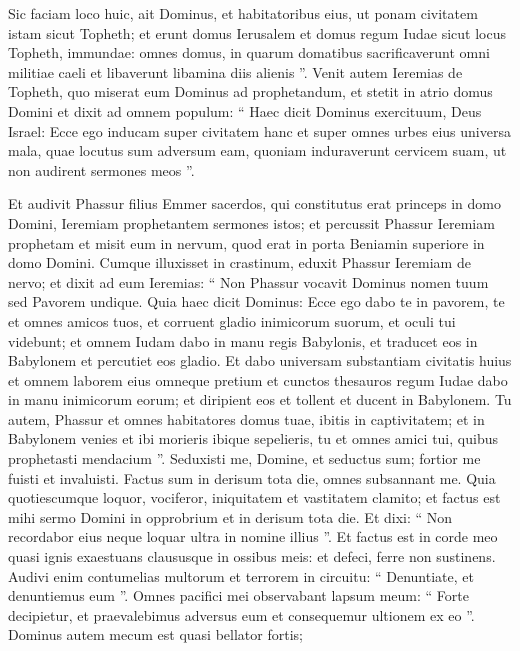 \begin{biblechapter}
\begin{biblechapter}
\begin{biblechapter}
\begin{biblechapter}
\begin{biblechapter}
\begin{biblechapter}
\begin{biblechapter}
\begin{biblechapter}
\begin{biblechapter}
\begin{biblechapter}
\begin{biblechapter}
\begin{biblechapter}
\begin{biblechapter}
\begin{biblechapter}
\begin{biblechapter}
\begin{biblechapter}
\begin{biblechapter}
\begin{biblechapter}
\begin{biblechapter}
\verse Sic faciam loco huic, ait Dominus, et habitatoribus eius, ut ponam civitatem istam sicut Topheth; 
\verse et erunt domus Ierusalem et domus regum Iudae sicut locus Topheth, immundae: omnes domus, in quarum domatibus sacrificaverunt omni militiae caeli et libaverunt libamina diis alienis ”.
 \verse Venit autem Ieremias de Topheth, quo miserat eum Dominus ad prophetandum, et stetit in atrio domus Domini et dixit ad omnem populum: 
\verse “ Haec dicit Dominus exercituum, Deus Israel: Ecce ego inducam super civitatem hanc et super omnes urbes eius universa mala, quae locutus sum adversum eam, quoniam induraverunt cervicem suam, ut non audirent sermones meos ”.
 
\begin{biblechapter}
\verse Et audivit Phassur filius Emmer sacerdos, qui constitutus erat princeps in domo Domini, Ieremiam prophetantem sermones istos; 
\verse et percussit Phassur Ieremiam prophetam et misit eum in nervum, quod erat in porta Beniamin superiore in domo Domini. 
\verse Cumque illuxisset in crastinum, eduxit Phassur Ieremiam de nervo; et dixit ad eum Ieremias: “ Non Phassur vocavit Dominus nomen tuum sed Pavorem undique. 
\verse Quia haec dicit Dominus: Ecce ego dabo te in pavorem, te et omnes amicos tuos, et corruent gladio inimicorum suorum, et oculi tui videbunt; et omnem Iudam dabo in manu regis Babylonis, et traducet eos in Babylonem et percutiet eos gladio. 
\verse Et dabo universam substantiam civitatis huius et omnem laborem eius omneque pretium et cunctos thesauros regum Iudae dabo in manu inimicorum eorum; et diripient eos et tollent et ducent in Babylonem. 
\verse Tu autem, Phassur et omnes habitatores domus tuae, ibitis in captivitatem; et in Babylonem venies et ibi morieris ibique sepelieris, tu et omnes amici tui, quibus prophetasti mendacium ”.
 \verse Seduxisti me, Domine, et seductus sum;
 fortior me fuisti et invaluisti.
 Factus sum in derisum tota die,
 omnes subsannant me.
 \verse Quia quotiescumque loquor, vociferor,
 iniquitatem et vastitatem clamito;
 et factus est mihi sermo Domini
 in opprobrium et in derisum tota die.
 \verse Et dixi: “ Non recordabor eius
 neque loquar ultra in nomine illius ”.
 Et factus est in corde meo quasi ignis exaestuans
 claususque in ossibus meis:
 et defeci, ferre non sustinens.
 \verse Audivi enim contumelias multorum
 et terrorem in circuitu:
 “ Denuntiate, et denuntiemus eum ”.
 Omnes pacifici mei observabant lapsum meum:
 “ Forte decipietur, et praevalebimus adversus eum
 et consequemur ultionem ex eo ”.
 \verse Dominus autem mecum est quasi bellator fortis;

\end{biblechapter}
\end{biblechapter}
\end{biblechapter}
\end{biblechapter}
\end{biblechapter}
\end{biblechapter}
\end{biblechapter}
\end{biblechapter}
\end{biblechapter}
\end{biblechapter}
\end{biblechapter}
\end{biblechapter}
\end{biblechapter}
\end{biblechapter}
\end{biblechapter}
\end{biblechapter}
\end{biblechapter}
\end{biblechapter}
\end{biblechapter}
\end{biblechapter}

